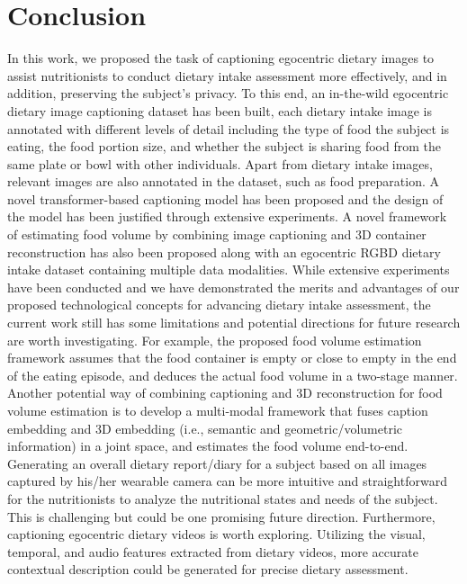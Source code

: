 \documentclass[journal]{IEEEtran}
\begin{document}
\section{Conclusion}\label{sec:conclusion}
In this work, we proposed the task of captioning egocentric dietary images to assist nutritionists to conduct dietary intake assessment more effectively, and in addition, preserving the subject's privacy. To this end, an in-the-wild egocentric dietary image captioning dataset has been built, each dietary intake image is annotated with different levels of detail including the type of food the subject is eating, the food portion size, and whether the subject is sharing food from the same plate or bowl with other individuals. Apart from dietary intake images, relevant images are also annotated in the dataset, such as food preparation. A novel transformer-based captioning model has been proposed and the design of the model has been justified through extensive experiments. A novel framework of estimating food volume by combining image captioning and 3D container reconstruction has also been proposed along with an egocentric RGBD dietary intake dataset containing multiple data modalities. While extensive experiments have been conducted and we have demonstrated the merits and advantages of our proposed technological concepts for advancing dietary intake assessment, the current work still has some limitations and potential directions for future research are worth investigating. For example, the proposed food volume estimation framework assumes that the food container is empty or close to empty in the end of the eating episode, and deduces the actual food volume in a two-stage manner. Another potential way of combining captioning and 3D reconstruction for food volume estimation is to develop a multi-modal framework that fuses caption embedding and 3D embedding (i.e., semantic and geometric/volumetric information) in a joint space, and estimates the food volume end-to-end. Generating an overall dietary report/diary for a subject based on all images captured by his/her wearable camera can be more intuitive and straightforward for the nutritionists to analyze the nutritional states and needs of the subject. This is challenging but could be one promising future direction. Furthermore, captioning egocentric dietary videos is worth exploring. Utilizing the visual, temporal, and audio features extracted from dietary videos, more accurate contextual description could be generated for precise dietary assessment.
\end{document}
